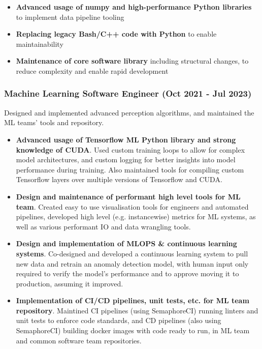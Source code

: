 \documentclass[12pt]{article}
\begin{document}
\begin{FlushLeft}
  \begin{itemize}
  \item \textbf{Advanced usage of numpy and high-performance Python libraries} to implement data pipeline tooling \\
  \item \textbf{Replacing legacy Bash/C++ code with Python} to enable maintainability \\
  \item \textbf{Maintenance of core software library} including structural changes, to reduce complexity and enable rapid development \\
  \end{itemize}

  \subsubsection{Machine Learning Software Engineer (Oct 2021 - Jul 2023)}
  Designed and implemented advanced perception algorithms, and maintained the ML teams' tools and repository. \\

  \begin{itemize}
  \item \textbf{Advanced usage of Tensorflow ML Python library and strong knowledge of CUDA}. Used custom training loops to allow for complex model architectures, and custom logging for better insights into model performance during training. Also maintained tools for compiling custom Tensorflow layers over multiple versions of Tensorflow and CUDA. \\
  \item \textbf{Design and maintenance of performant high level tools for ML team}. Created easy to use visualisation tools for engineers and automated pipelines, developed high level (e.g. instancewise) metrics for ML systems, as well as various performant IO and data wrangling tools. \\
  \item \textbf{Design and implementation of MLOPS \& continuous learning systems}. Co-designed and developed a continuous learning system to pull new data and retrain an anomaly detection model, with human input only required to verify the model's performance and to approve moving it to production, assuming it improved.
  \item \textbf{Implementation of CI/CD pipelines, unit tests, etc. for ML team repository}. Maintined CI pipelines (using SemaphoreCI) running linters and unit tests to enforce code standards, and CD pipelines (also using SemaphoreCI) building docker images with code ready to run, in ML team and common software team repositories.
  \end{itemize}


\end{FlushLeft}
\end{document}
